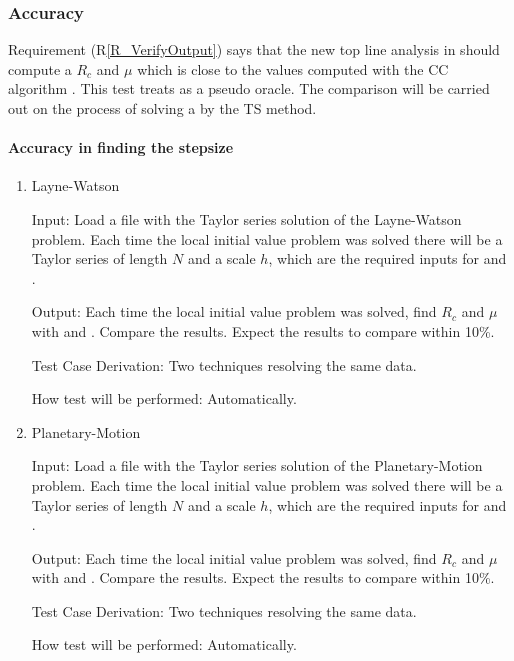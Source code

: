 \documentclass[12pt, titlepage]{article}
\newcommand{\rref}[1]{(R\ref{#1})}
\begin{document}
\subsubsection{Accuracy}

Requirement \rref{R_VerifyOutput} says that the new top line
analysis in  should compute a $R_c$ and $\mu$ which is
close to the values computed with the CC algorithm \rdcon.
This test treats \rdcon as a pseudo oracle.
The comparison will be carried out on the process of solving a \dae \ivp by the TS method.

\paragraph{Accuracy in finding the stepsize}

\begin{enumerate}

\item{Layne-Watson \citep{watson1979}\\}

					
					
Input: Load a file with the Taylor series solution of the Layne-Watson problem. Each time the
    local initial value problem was solved there will be a Taylor series of length $N$ and a scale $h$,
    which are the required inputs for  and \rdcon.
					
Output: Each time the local initial value problem was solved, find $R_c$ and $\mu$ with
     and \rdcon. Compare the results. Expect the results to compare within 10\%.

Test Case Derivation: Two techniques resolving the same data.
					
How test will be performed: Automatically.
					
\item{Planetary-Motion \citep{enright1987examples}\\}

					
					
Input: Load a file with the Taylor series solution of the Planetary-Motion problem. Each time the
    local initial value problem was solved there will be a Taylor series of length $N$ and a scale $h$,
    which are the required inputs for  and \rdcon.
					
Output: Each time the local initial value problem was solved, find $R_c$ and $\mu$ with
     and \rdcon. Compare the results. Expect the results to compare within 10\%.

Test Case Derivation: Two techniques resolving the same data.
					
How test will be performed: Automatically.

\end{enumerate}
\end{document}
